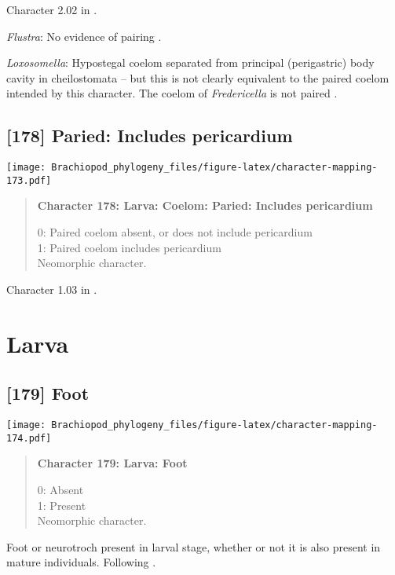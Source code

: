 \documentclass[openany]{book}
\theoremstyle{definition}
\theoremstyle{definition}
\theoremstyle{definition}
\theoremstyle{remark}
\begin{document}
Character 2.02 in \citet{Scheltema1993}.

\hypertarget{Flustra-coding-177}{}
\emph{Flustra}: No evidence of pairing \citep{Reed1982}.

\hypertarget{Loxosomella-coding-177}{}
\emph{Loxosomella}: Hypostegal coelom separated from principal
(perigastric) body cavity in cheilostomata -- but this is not clearly
equivalent to the paired coelom intended by this character. The coelom
of \emph{Fredericella} is not paired \citep{Gruhl2010F}.

\subsection*{{[}178{]} Paried: Includes
pericardium}\label{paried-includes-pericardium}

\texttt{[image: Brachiopod\_phylogeny\_files/figure-latex/character-mapping-173.pdf]}

\begin{quote}
\textbf{Character 178: Larva: Coelom: Paried: Includes pericardium}

0: Paired coelom absent, or does not include pericardium\\
1: Paired coelom includes pericardium\\
Neomorphic character.
\end{quote}

Character 1.03 in \citet{Scheltema1993}.

\section{Larva}\label{larva-1}

\subsection*{{[}179{]} Foot}\label{foot-1}

\texttt{[image: Brachiopod\_phylogeny\_files/figure-latex/character-mapping-174.pdf]}

\begin{quote}
\textbf{Character 179: Larva: Foot}

0: Absent\\
1: Present\\
Neomorphic character.
\end{quote}

Foot or neurotroch present in larval stage, whether or not it is also
present in mature individuals. Following \citet{Wingstrand1985}.
\end{document}
